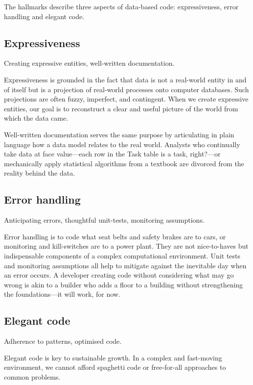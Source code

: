 \documentclass[10pt,openany,10pt]{book}
\begin{document}
The hallmarks describe three aspects of data-based code: expressiveness,
error handling and elegant code.

\subsection{Expressiveness}\label{expressiveness-1}

Creating expressive entities, well-written documentation.

Expressiveness is grounded in the fact that data is not a real-world
entity in and of itself but is a projection of real-world processes onto
computer databases. Such projections are often fuzzy, imperfect, and
contingent. When we create expressive entities, our goal is to
reconstruct a clear and useful picture of the world from which the data
came.

Well-written documentation serves the same purpose by articulating in
plain language how a data model relates to the real world. Analysts who
continually take data at face value---each row in the Task table is a
task, right?---or mechanically apply statistical algorithms from a
textbook are divorced from the reality behind the data.

\subsection{Error handling}\label{error-handling}

Anticipating errors, thoughtful unit-tests, monitoring assumptions.

Error handling is to code what seat belts and safety brakes are to cars,
or monitoring and kill-switches are to a power plant. They are not
nice-to-haves but indispensable components of a complex computational
environment. Unit tests and monitoring assumptions all help to mitigate
against the inevitable day when an error occurs. A developer creating
code without considering what may go wrong is akin to a builder who adds
a floor to a building without strengthening the foundations---it will
work, for now.

\subsection{Elegant code}\label{elegant-code}

Adherence to patterns, optimised code.

Elegant code is key to sustainable growth. In a complex and fast-moving
environment, we cannot afford spaghetti code or free-for-all approaches
to common problems.
\end{document}
